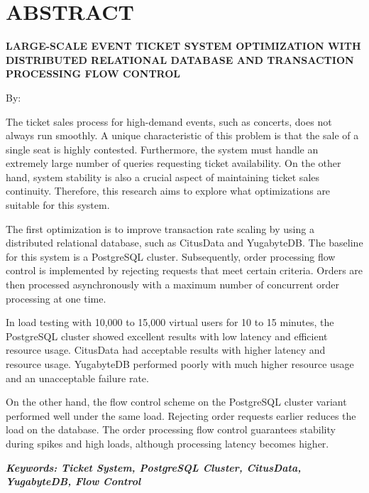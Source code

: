 \clearpage
\chapter*{ABSTRACT}

\begin{center}
  \center
  \begin{singlespace}
    \large\bfseries\MakeUppercase{Large-Scale Event Ticket System Optimization with Distributed Relational Database and Transaction Processing Flow Control}

    \normalfont\normalsize
    By:

    \bfseries \theauthor
  \end{singlespace}
\end{center}


\begin{singlespace}
  \small
  The ticket sales process for high-demand events, such as concerts, does not always run smoothly. A unique characteristic of this problem is that the sale of a single seat is highly contested. Furthermore, the system must handle an extremely large number of queries requesting ticket availability. On the other hand, system stability is also a crucial aspect of maintaining ticket sales continuity. Therefore, this research aims to explore what optimizations are suitable for this system.

  The first optimization is to improve transaction rate scaling by using a distributed relational database, such as CitusData and YugabyteDB. The baseline for this system is a PostgreSQL cluster. Subsequently, order processing flow control is implemented by rejecting requests that meet certain criteria. Orders are then processed asynchronously with a maximum number of concurrent order processing at one time.

  In load testing with 10,000 to 15,000 virtual users for 10 to 15 minutes, the PostgreSQL cluster showed excellent results with low latency and efficient resource usage. CitusData had acceptable results with higher latency and resource usage. YugabyteDB performed poorly with much higher resource usage and an unacceptable failure rate.

  On the other hand, the flow control scheme on the PostgreSQL cluster variant performed well under the same load. Rejecting order requests earlier reduces the load on the database. The order processing flow control guarantees stability during spikes and high loads, although processing latency becomes higher.

  \textbf{\textit{Keywords: Ticket System, PostgreSQL Cluster, CitusData, YugabyteDB, Flow Control}}
\end{singlespace}
\clearpage

\clearpage